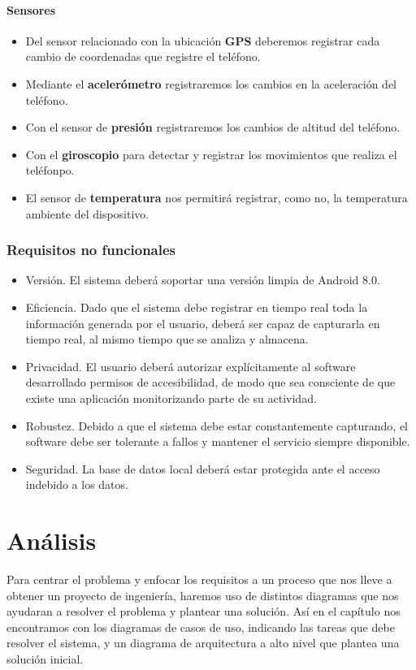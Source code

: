 \documentclass[12pt,a4paper,oneside]{book} %
\begin{document}
\subsubsection{Sensores}
\begin{itemize}
  \item Del sensor relacionado con la ubicación \textbf{GPS} deberemos registrar cada cambio de coordenadas que registre el teléfono. 
  \item Mediante el \textbf{acelerómetro} registraremos los cambios en la aceleración del teléfono. 
  \item Con el sensor de \textbf{presión} registraremos los cambios de altitud del teléfono. 
  \item Con el \textbf{giroscopio} para detectar y registrar  los movimientos que realiza el teléfonpo. 
  \item El sensor de \textbf{temperatura} nos permitirá registrar, como no, la temperatura ambiente del dispositivo. 
\end{itemize}
\newpage
\subsection{Requisitos no funcionales}
\begin{itemize}
	\item Versión. El sistema deberá soportar una versión limpia de Android 8.0. 
	\item Eficiencia. Dado que el sistema debe registrar en tiempo real toda la información generada por el usuario, deberá ser capaz de capturarla en tiempo real, al mismo tiempo que se analiza y almacena. 
	\item Privacidad. El usuario deberá autorizar explícitamente al software desarrollado permisos de accesibilidad, de modo que sea consciente de que existe una aplicación monitorizando parte de su actividad.
	\item Robustez. Debido a que el sistema debe estar constantemente capturando, el software debe ser tolerante a fallos y mantener el servicio siempre disponible.  
	\item Seguridad. La base de datos local deberá estar protegida ante el acceso indebido a los datos. 
\end{itemize}
\break
\chapter{Análisis}
Para centrar el problema y enfocar los requisitos a un proceso que nos lleve a obtener un proyecto de ingeniería, haremos uso de distintos diagramas que nos ayudaran a resolver el problema y plantear una solución. Así en el capítulo nos encontramos con los diagramas de casos de uso, indicando las tareas que debe resolver el sistema, y un diagrama de arquitectura a alto nivel que plantea una solución inicial. 
\pagebreak
\end{document}
